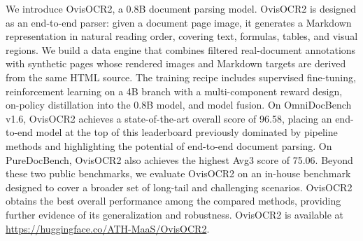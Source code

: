 We introduce OvisOCR2, a 0.8B document parsing model. OvisOCR2 is designed as an end-to-end parser: given a document page image, it generates a Markdown representation in natural reading order, covering text, formulas, tables, and visual regions. We build a data engine that combines filtered real-document annotations with synthetic pages whose rendered images and Markdown targets are derived from the same HTML source. The training recipe includes supervised fine-tuning, reinforcement learning on a 4B branch with a multi-component reward design, on-policy distillation into the 0.8B model, and model fusion. On OmniDocBench v1.6, OvisOCR2 achieves a state-of-the-art overall score of 96.58, placing an end-to-end model at the top of this leaderboard previously dominated by pipeline methods and highlighting the potential of end-to-end document parsing. On PureDocBench, OvisOCR2 also achieves the highest Avg3 score of 75.06. Beyond these two public benchmarks, we evaluate OvisOCR2 on an in-house benchmark designed to cover a broader set of long-tail and challenging scenarios. OvisOCR2 obtains the best overall performance among the compared methods, providing further evidence of its generalization and robustness. OvisOCR2 is available at \url{https://huggingface.co/ATH-MaaS/OvisOCR2}.
